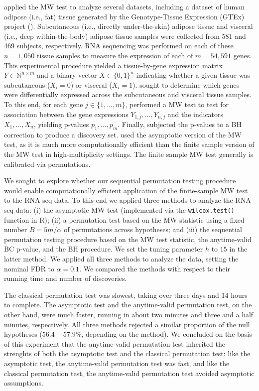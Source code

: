 \documentclass[12pt]{article}
\newcommand{\N}{\mathbb{N}}
\begin{document}
\cite{Li2022} applied the MW test to analyze several datasets, including a dataset of human adipose (i.e., fat) tissue generated by the Genotype-Tissue Expression (GTEx) project (\cite{Lonsdale2013}). Subcutaneous (i.e., directly under-the-skin) adipose tissue and visceral (i.e., deep within-the-body) adipose tissue samples were collected from 581 and 469 subjects, respectively. RNA sequencing was performed on each of these $n = 1,050$ tissue samples to measure the expression of each of $m = 54,591$ genes. This experimental procedure yielded a tissue-by-gene expression matrix $Y \in \N^{n \times m}$ and a binary vector $X \in \{0,1\}^{n}$ indicating whether a given tissue was subcutaneous ($X_i = 0$) or visceral ($X_i = 1$). \cite{Li2022} sought to determine which genes were differentially expressed across the subcutaneous and visceral tissue samples. To this end, for each gene $j \in \{1, \dots, m\}$, \cite{Li2022} performed a MW test to test for association between the gene expressions $Y_{1,j}, \dots, Y_{n,j}$ and the indicators $X_1, \dots, X_n$, yielding p-values $p_1, \dots, p_m$. Finally, \cite{Li2022} subjected the p-values to a BH correction to produce a discovery set. \cite{Li2022} used the asymptotic version of the MW test, as it is much more computationally efficient than the finite sample version of the MW test in high-multiplicity settings. The finite sample MW test generally is calibrated via permutations.

We sought to explore whether our sequential permutation testing procedure would enable computationally efficient application of the finite-sample MW test to the RNA-seq data. To this end we applied three methods to analyze the RNA-seq data: (i) the asymptotic MW test (implemented via the \texttt{wilcox.test()} function in R); (ii) a permutation test based on the MW statistic using a fixed number $B = 5m/\alpha$ of permutations across hypotheses; and (iii) the sequential permutation testing procedure based on the MW test statistic, the anytime-valid BC p-value, and the BH procedure. We set the tuning parameter $h$ to $15$ in the latter method. We applied all three methods to analyze the data, setting the nominal FDR to $\alpha = 0.1$. We compared the methods with respect to their running time and number of discoveries.
	
The classical permutation test was slowest, taking over three days and 14 hours to complete. The asymptotic test and the anytime-valid permutation test, on the other hand, were much faster, running in about two minutes and three and a half minutes, respectively. All three methods rejected a similar proportion of the null hypotheses ($56.4 - 57.9$\%, depending on the method). We concluded on the basis of this experiment that the anytime-valid permutation test inherited the strenghts of both the asymptotic test and the classical permutation test: like the asymptotic test, the anytime-valid permutation test was fast, and like the classical permutation test, the anytime-valid permutation test avoided asymptotic assumptions.
		
\end{document}
